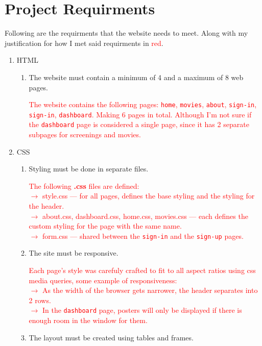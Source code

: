 \documentclass[a4paper]{article}
\begin{document}
\section{Project Requirments}
    Following are the requirments that the website needs to meet. Along with my justification for how I met said requirments in \textcolor{red}{red}.
    \begin{enumerate}
        \item HTML
            \begin{enumerate}[label={$-$}]
            \item The website must contain a minimum of 4 and a maximum of 8 web pages. 
            
            \textcolor{red}{The website contains the following pages: \texttt{home}, \texttt{movies}, \texttt{about}, \texttt{sign-in}, \texttt{sign-in}, \texttt{dashboard}. Making 6 pages in total. Although I'm not sure if the \texttt{dashboard} page is considered a single page, since it has 2 separate subpages for screenings and movies.}
            \end{enumerate}
        \item CSS
            \begin{enumerate}[label={$-$}]
            \item Styling must be done in separate files. 
            
            \textcolor{red}{The following \textbf{.css} files are defined:\\$\rightarrow$ style.css --- for all pages, defines the base styling and the styling for the header.\\$\rightarrow$ about.css, dashboard.css, home.css, movies.css --- each defines the custom styling for the page with the same name.\\$\rightarrow$ form.css --- shared between the \texttt{sign-in} and the \texttt{sign-up}  pages.}
            \item The site must be responsive.

            \textcolor{red}{Each page's style was carefuly crafted to fit to all aspect ratios using css media queries, some example of responsiveness:\\$\rightarrow$ As the width of the browser gets narrower, the header separates into 2 rows.\\$\rightarrow$ In the \texttt{dashboard} page, posters will only be displayed if there is enough room in the window for them.}
            \item The layout must be created using tables and frames.
            

\end{enumerate}
\end{enumerate}
\end{document}
